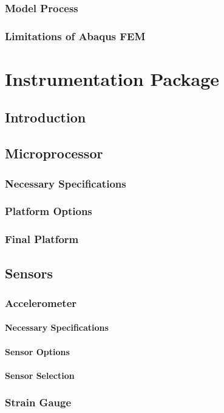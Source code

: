 \documentclass[twoside,11pt]{report}
\begin{document}
		\subsection{Model Process}
		\subsection{Limitations of Abaqus FEM}

\chapter{Instrumentation Package}
	\section{Introduction}
	\section{Microprocessor}
		\subsection{Necessary Specifications}
		\subsection{Platform Options}
		\subsection{Final Platform}
	\section{Sensors}
		\subsection{Accelerometer}
			\subsubsection{Necessary Specifications}
			\subsubsection{Sensor Options}
			\subsubsection{Sensor Selection}
		\subsection{Strain Gauge}
\end{document}
